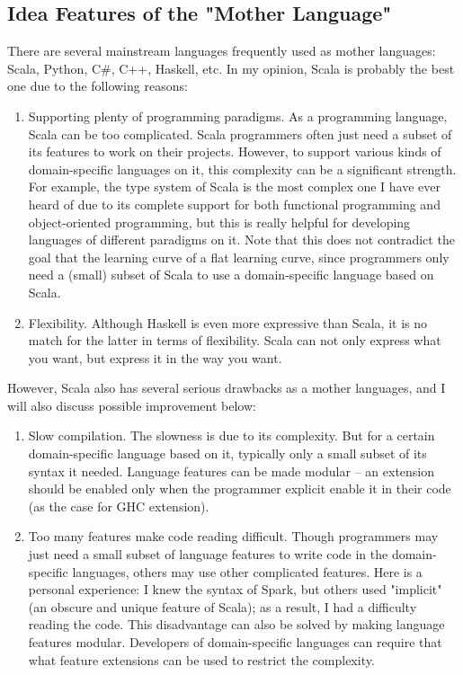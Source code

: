 \documentclass[11pt]{article}
\begin{document}
\subsection{Idea Features of the "Mother Language"}
There are several mainstream languages frequently used as mother languages: Scala, Python, C\#, C++, Haskell, etc.
In my opinion, Scala is probably the best one due to the following reasons:
\begin{enumerate}
    \item Supporting plenty of programming paradigms.
    As a programming language, Scala can be too complicated.
    Scala programmers often just need a subset of its features to work on their projects.
    However, to support various kinds of domain-specific languages on it, this complexity can be a significant strength.
    For example, the type system of Scala is the most complex one I have ever heard of due to its complete support for both functional programming and object-oriented programming, but this is really helpful for developing languages of different paradigms on it.
    Note that this does not contradict the goal that the learning curve of a flat learning curve, since programmers only need a (small) subset of Scala to use a domain-specific language based on Scala.
    \item Flexibility.
    Although Haskell is even more expressive than Scala, it is no match for the latter in terms of flexibility.
    Scala can not only express what you want, but express it in the way you want.
\end{enumerate}

However, Scala also has several serious drawbacks as a mother languages, and I will also discuss possible improvement below:
\begin{enumerate}
    \item Slow compilation.
    The slowness is due to its complexity.
    But for a certain domain-specific language based on it, typically only a small subset of its syntax it needed.
    Language features can be made modular -- an extension should be enabled only when the programmer explicit enable it in their code (as the case for GHC extension).
    \item Too many features make code reading difficult.
    Though programmers may just need a small subset of language features to write code in the domain-specific languages, others may use other complicated features.
    Here is a personal experience:
    I knew the syntax of Spark, but others used "implicit" (an obscure and unique feature of Scala); as a result, I had a difficulty reading the code.
    This disadvantage can also be solved by making language features modular.
    Developers of domain-specific languages can require that what feature extensions can be used to restrict the complexity.
\end{enumerate}
\end{document}
